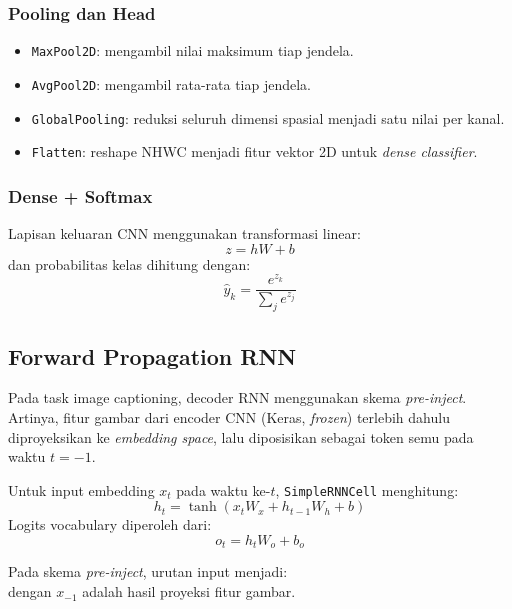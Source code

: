 \subsubsection{Pooling dan Head}
\begin{itemize}
    \item \texttt{MaxPool2D}: mengambil nilai maksimum tiap jendela.
    \item \texttt{AvgPool2D}: mengambil rata-rata tiap jendela.
    \item \texttt{GlobalPooling}: reduksi seluruh dimensi spasial menjadi satu nilai per kanal.
    \item \texttt{Flatten}: reshape NHWC menjadi fitur vektor 2D untuk \textit{dense classifier}.
\end{itemize}

\subsubsection{Dense + Softmax}
Lapisan keluaran CNN menggunakan transformasi linear:
\begin{equation}
z = hW + b
\end{equation}
dan probabilitas kelas dihitung dengan:
\begin{equation}
\hat{y}_k = \frac{e^{z_k}}{\sum_j e^{z_j}}
\end{equation}

\subsection{Forward Propagation RNN}

Pada task image captioning, decoder RNN menggunakan skema \textit{pre-inject}. Artinya, fitur gambar dari encoder CNN (Keras, \textit{frozen}) terlebih dahulu diproyeksikan ke \textit{embedding space}, lalu diposisikan sebagai token semu pada waktu $t=-1$.

Untuk input embedding $x_t$ pada waktu ke-$t$, \texttt{SimpleRNNCell} menghitung:
\begin{equation}
h_t = \tanh(x_t W_x + h_{t-1} W_h + b)
\end{equation}
Logits vocabulary diperoleh dari:
\begin{equation}
o_t = h_t W_o + b_o
\end{equation}

Pada skema \textit{pre-inject}, urutan input menjadi:
\begin{equation}
[x_{-1}, x_0, x_1, \ldots, x_{T-1}]
\end{equation}
dengan $x_{-1}$ adalah hasil proyeksi fitur gambar.

